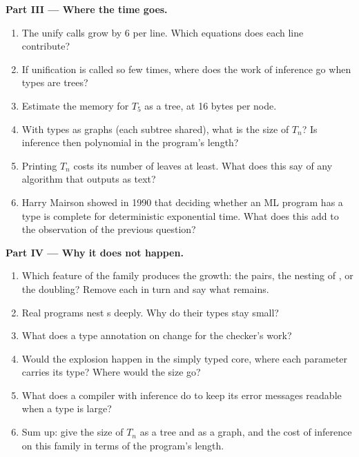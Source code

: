 \begin{problem}
\medskip\noindent\textbf{Part III --- Where the time goes.}
\begin{enumerate}[resume]
\item The unify calls grow by 6 per line. Which equations does each  line contribute?
\item If unification is called so few times, where does the work of inference go when types are trees?
\item Estimate the memory for $T_5$ as a tree, at 16 bytes per node.
\item With types as graphs (each subtree shared), what is the size of $T_n$? Is inference then polynomial in the program's length?
\item Printing $T_n$ costs its number of leaves at least. What does this say of any algorithm that outputs  as text?
\item Harry Mairson showed in 1990 that deciding whether an ML program has a type is complete for deterministic exponential time. %
What does this add to the observation of the previous question?
\end{enumerate}

\medskip\noindent\textbf{Part IV --- Why it does not happen.}
\begin{enumerate}[resume]
\item Which feature of the family produces the growth: the pairs, the nesting of , or the doubling? Remove each in turn and say what remains.
\item Real programs nest s deeply. Why do their types stay small?
\item What does a type annotation on  change for the checker's work?
\item Would the explosion happen in the simply typed core, where each parameter carries its type? Where would the size go?
\item What does a compiler with inference do to keep its error messages readable when a type is large?
\item Sum up: give the size of $T_n$ as a tree and as a graph, and the cost of inference on this family in terms of the program's length.
\end{enumerate}
\end{problem}
